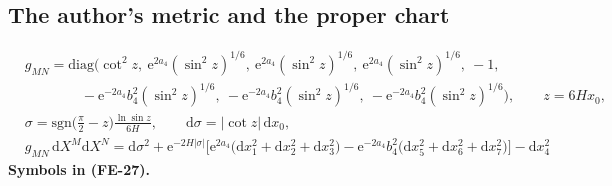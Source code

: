 \documentclass[
  10pt,
]{article}
\begin{document}
\hypertarget{the-authors-metric-and-the-proper-chart}{%
\subsection{The author's metric and the proper
chart}\label{the-authors-metric-and-the-proper-chart}}

\[
\begin{aligned}
&g_{MN} = \mathrm{diag}\Big(\cot^2z,\ \mathrm{e}^{2a_4}(\sin^2z)^{1/6},\ \mathrm{e}^{2a_4}(\sin^2z)^{1/6},
 \ \mathrm{e}^{2a_4}(\sin^2z)^{1/6},\ -1,\\
&\qquad\qquad -\mathrm{e}^{-2a_4}b_4^2(\sin^2z)^{1/6},\ -\mathrm{e}^{-2a_4}b_4^2(\sin^2z)^{1/6},
 \ -\mathrm{e}^{-2a_4}b_4^2(\sin^2z)^{1/6}\Big),\qquad z = 6Hx_0,\\
&\sigma = \mathrm{sgn}\Big(\frac{\pi}{2} - z\Big)\frac{\ln\sin z}{6H},\qquad \mathrm{d}\sigma = \lvert\cot z\rvert\,\mathrm{d}x_0,\\
&g_{MN}\,\mathrm{d}X^M\mathrm{d}X^N = \mathrm{d}\sigma^2 + \mathrm{e}^{-2H\lvert\sigma\rvert}\Big[\mathrm{e}^{2a_4}\big(\mathrm{d}x_1^2
 + \mathrm{d}x_2^2 + \mathrm{d}x_3^2\big) - \mathrm{e}^{-2a_4}b_4^2\big(\mathrm{d}x_5^2 + \mathrm{d}x_6^2 + \mathrm{d}x_7^2\big)\Big]
 - \mathrm{d}x_4^2
\end{aligned} \tag{FE-27}
\] \textbf{Symbols in (FE-27).}
\end{document}

